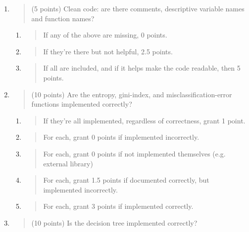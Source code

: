\documentclass[
]{article}
\begin{document}
\begin{enumerate}
\def\labelenumi{\arabic{enumi}.}
\item
  \begin{quote}
  (5 points) Clean code: are there comments, descriptive variable names
  and function names?
  \end{quote}

  \begin{enumerate}
  \def\labelenumii{\alph{enumii}.}
  \item
    \begin{quote}
    If any of the above are missing, 0 points.
    \end{quote}
  \item
    \begin{quote}
    If they're there but not helpful, 2.5 points.
    \end{quote}
  \item
    \begin{quote}
    If all are included, and if it helps make the code readable, then 5
    points.
    \end{quote}
  \end{enumerate}
\item
  \begin{quote}
  (10 points) Are the entropy, gini-index, and misclassification-error
  functions implemented correctly?
  \end{quote}

  \begin{enumerate}
  \def\labelenumii{\alph{enumii}.}
  \item
    \begin{quote}
    If they're all implemented, regardless of correctness, grant 1
    point.
    \end{quote}
  \item
    \begin{quote}
    For each, grant 0 points if implemented incorrectly.
    \end{quote}
  \item
    \begin{quote}
    For each, grant 0 points if not implemented themselves (e.g.
    external library)
    \end{quote}
  \item
    \begin{quote}
    For each, grant 1.5 points if documented correctly, but implemented
    incorrectly.
    \end{quote}
  \item
    \begin{quote}
    For each, grant 3 points if implemented correctly.
    \end{quote}
  \end{enumerate}
\item
  \begin{quote}
  (10 points) Is the decision tree implemented correctly?
  \end{quote}


\end{enumerate}
\end{document}
